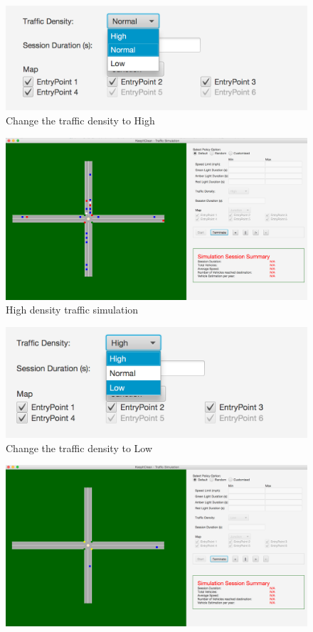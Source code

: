 \documentclass[11pt]{article}
\begin{document}
\begin{enumerate}
\begin{figure}[H]
        \includegraphics[width=12cm]{Test4}
        \centering
        \caption{Change the traffic density to High}
        \label{fig:test4}
\end{figure}
\begin{figure}[H]
        \includegraphics[width=12cm]{Test5}
        \centering
        \caption{High density traffic simulation}
        \label{fig:test5}
\end{figure}
\begin{figure}[H]
        \includegraphics[width=12cm]{Test6}
        \centering
        \caption{Change the traffic density to Low}
        \label{fig:test6}
\end{figure}
\begin{figure}[H]
        \includegraphics[width=12cm]{Test7}

\end{figure}
\end{enumerate}
\end{document}
